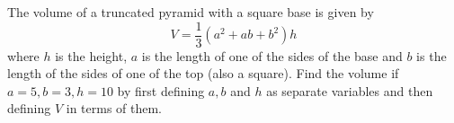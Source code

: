 {The volume of a truncated pyramid with a square base is given by 
\[
V=\frac{1}{3} (a^2 + ab +b^2)h
\] 
where $h$ is the height, $a$ is the length of one of the sides of the base and $b$ is the length of the sides of one of the top (also a square).  Find the volume if $a=5, b=3, h=10$ by first defining $a, b$ and $h$ as separate variables and then defining $V$ in terms of them.}
{}